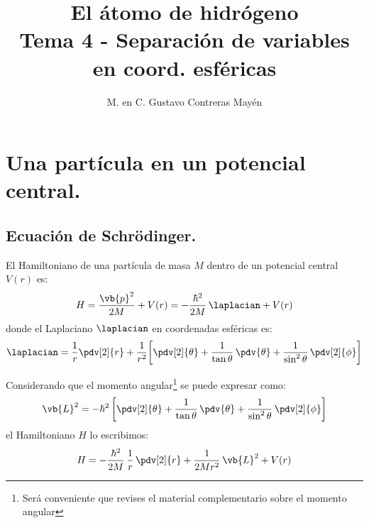 
\title{El átomo de hidrógeno \\ \large {Tema 4 - Separación de variables en coord. esféricas}\vspace{-3ex}}

\author{M. en C. Gustavo Contreras Mayén}
\date{ }

\pagestyle{fancy}
\fancyhf{}
\lhead{\leftmark}
\rfoot{\thepage}
\setlength{\headheight}{16pt}%



\maketitle
\fontsize{14}{14}\selectfont
\tableofcontents
\newpage


\section{Una partícula en un potencial central.}
\subsection{Ecuación de Schrödinger.}

El Hamiltoniano de una partícula de masa $M$ dentro de un potencial central $V (r)$ es:
\begin{align}
H = \dfrac{\vb{p}^{2}}{2 M} + V (r) = - \dfrac{\hbar^{2}}{2 M} \, \laplacian + V (r)
\label{eq:ecuacion_08_01}
\end{align}
donde el Laplaciano $\laplacian$ en coordenadas esféricas es:
\begin{align}
\laplacian = \dfrac{1}{r} \pdv[2]{r} + \dfrac{1}{r^{2}} \bigg[ \pdv[2]{\theta} + \dfrac{1}{\tan \theta} \, \pdv{\theta} + \dfrac{1}{\sin^{2} \theta} \, \pdv[2]{\phi} \bigg]
\label{eq:ecuacion_08_02}
\end{align}

Considerando que el momento angular\footnote{Será conveniente que revises el material complementario sobre el momento angular} se puede expresar como:
\begin{align}
\vb{L}^{2} = - \hbar^{2} \, \bigg[ \pdv[2]{\theta} + \dfrac{1}{\tan \theta} \, \pdv{\theta} + \dfrac{1}{\sin^{2} \theta} \, \pdv[2]{\phi}  \bigg]
\label{eq:ecuacion_08_01_06}
\end{align}
el Hamiltoniano $H$ lo escribimos:
\begin{align}
H = - \dfrac{\hbar^{2}}{2 M} \, \dfrac{1}{r} \, \pdv[2]{r} + \dfrac{1}{2 M r^{2}} \, \vb{L}^{2} + V (r)
\label{eq:ecuacion_08_03}
\end{align}


